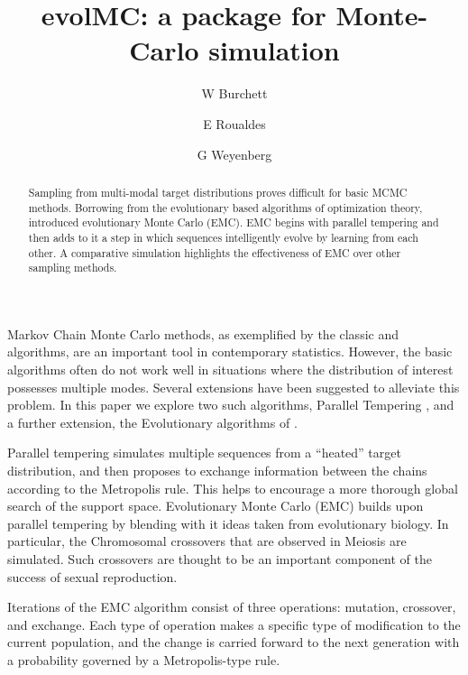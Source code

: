 \documentclass[12pt]{article}\usepackage[]{graphicx}\usepackage[]{color}
\title{evolMC: a package for Monte-Carlo simulation}
\author{W Burchett \and E Roualdes \and G Weyenberg}
\begin{document}
\maketitle
\doublespacing

\begin{abstract}
  Sampling from multi-modal target distributions proves difficult for basic MCMC methods.  Borrowing from the evolutionary based algorithms of optimization theory, \cite{Liang:2000} introduced evolutionary Monte Carlo (EMC).  EMC begins with parallel tempering and then adds to it a step in which sequences intelligently evolve by learning from each other.  A comparative simulation highlights the effectiveness of EMC over other sampling methods.
\end{abstract}

\vspace{1cm}
\label{sec:introduction}
Markov Chain Monte Carlo methods, as exemplified by the classic
\cite{Metropolis:1953} and \cite{Hastings:1970} algorithms, are an
important tool in contemporary statistics.  However, the basic
algorithms often do not work well in situations where the distribution of
interest possesses multiple modes. Several extensions have been
suggested to alleviate this problem. In this paper we explore two such
algorithms, Parallel Tempering \citep{swendsen1986replica}, and a further
extension, the Evolutionary algorithms of \cite{Liang:2000}.

Parallel tempering  simulates multiple sequences from a ``heated''
target distribution, and then proposes to exchange information between
the chains according to the Metropolis rule. This helps to encourage a
more thorough global search of the support space. \citep{Liang:2011}
Evolutionary Monte Carlo (EMC) builds upon parallel tempering by
blending with it ideas taken from evolutionary biology. In particular,
the Chromosomal crossovers that are observed in Meiosis are
simulated. Such crossovers are thought to be an important component of
the success of sexual reproduction.



Iterations of the EMC algorithm consist of three operations: mutation,
crossover, and exchange. Each type of operation makes a specific type
of modification to the current population, and the change is carried
forward to the next generation with a probability governed by a
Metropolis-type rule.\citep{Liang:2011}
\end{document}
